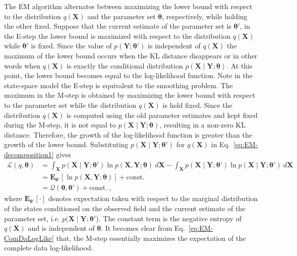 \documentclass[review,authoryear,3p]{elsarticle}
\begin{document}
The EM algorithm alternates between maximizing the lower bound with respect to the distribution $q(\mathbf X)$ and the parameter set $\boldsymbol\theta$, respectively, while holding the other fixed. Suppose that the current estimate of the parameter set is $\boldsymbol\theta'$, in the E-step the lower bound is maximized with respect to the distribution $q(\mathbf X)$ while $\boldsymbol\theta'$ is fixed. Since the value of $p(\mathbf Y;\boldsymbol\theta')$ is independent of $q(\mathbf X)$ the maximum of the lower bound occurs when the KL distance disappears or in other words when $q(\mathbf X)$ is exactly the conditional distribution $p(\mathbf X \mid \mathbf Y;\boldsymbol\theta)$. At this point, the lower bound becomes equal to the log-likelihood function. Note in the state-space model the E-step is equivalent to the smoothing problem. The maximum in the M-step is obtained by maximizing the lower bound with respect to the parameter set while the distribution $q(\mathbf X)$ is held fixed. Since the distribution $q(\mathbf X)$ is computed using the old parameter estimates and kept fixed during the M-step, it is not equal to $p(\mathbf X \mid \mathbf Y;\boldsymbol\theta)$, resulting in a non-zero KL distance. Therefore, the growth of the log-likelihood function is greater than the growth of the lower bound. Substituting $p(\mathbf X \mid \mathbf Y;\boldsymbol\theta')$ for $q(\mathbf X)$ in Eq.~\eqref{eq:EM-decomposition1} gives
\begin{align}
 \mathcal{L}(q,\boldsymbol\theta)&=\int_{\mathbf X} p(\mathbf X\mid\mathbf Y;\boldsymbol\theta')\ln p(\mathbf X,\mathbf Y;\boldsymbol\theta)~d\mathbf X-\int_{\mathbf X} p(\mathbf X\mid\mathbf Y;\boldsymbol\theta')\ln p(\mathbf X\mid\mathbf Y;\boldsymbol\theta')~d\mathbf X \nonumber \\
&= \mathbf E_{\boldsymbol\theta'}\left[ \ln p(\mathbf X,\mathbf Y;\boldsymbol\theta)\right] +\mathrm{const.}\nonumber\\
&=\mathcal{Q}(\boldsymbol\theta,\boldsymbol\theta')+\mathrm{const.}~,\label{eq:EM-ComDaLogLike}
\end{align}
where $ \mathbf E_{\boldsymbol \theta'}\left[ \cdot\right] $ denotes expectation taken with respect to the marginal distribution of the states conditioned on the observed field and the current estimate of the parameter set, i.e.  $p(\mathbf X\mid\mathbf Y;\boldsymbol \theta'$). The constant term is the negative entropy of $q(\mathbf X)$ and is independent of $\boldsymbol\theta$.   It becomes clear from Eq.~\eqref{eq:EM-ComDaLogLike} that, the M-step essentially maximizes the expectation of the complete data log-likelihood. 
\end{document}
